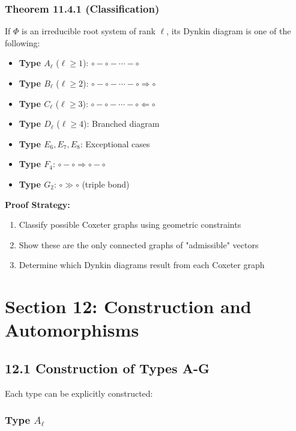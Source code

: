 \subsubsection{Theorem 11.4.1 (Classification)}

If $\Phi$ is an irreducible root system of rank $\ell$, its Dynkin diagram is one of the following:

\begin{itemize}
	\item \textbf{Type $A_\ell$} ($\ell \geq 1$): $\circ - \circ - \cdots - \circ$
	\item \textbf{Type $B_\ell$} ($\ell \geq 2$): $\circ - \circ - \cdots - \circ \Rightarrow \circ$
	\item \textbf{Type $C_\ell$} ($\ell \geq 3$): $\circ - \circ - \cdots - \circ \Leftarrow \circ$
	\item \textbf{Type $D_\ell$} ($\ell \geq 4$): Branched diagram
	\item \textbf{Type $E_6, E_7, E_8$}: Exceptional cases
	\item \textbf{Type $F_4$}: $\circ - \circ \Rightarrow \circ - \circ$
	\item \textbf{Type $G_2$}: $\circ \gg \circ$ (triple bond)
\end{itemize}

\textbf{Proof Strategy:}

\begin{enumerate}
	\item Classify possible Coxeter graphs using geometric constraints
	\item Show these are the only connected graphs of "admissible" vectors
	\item Determine which Dynkin diagrams result from each Coxeter graph
\end{enumerate}


\section{Section 12: Construction and Automorphisms}

\subsection{12.1 Construction of Types A-G}

Each type can be explicitly constructed:

\subsubsection{Type \texorpdfstring{$A_\ell$}{A_ell}}


